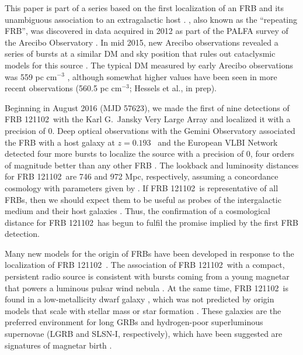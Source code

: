 \documentclass[twocolumn]{aastex61}
\newcommand{\frb}{FRB 121102}
\begin{document}
This paper is part of a series based on the first localization of an FRB and its unambiguous association to an extragalactic host \citep{LOC, OPT, EVN}. , also known as the ``repeating FRB'', was discovered \citep{2014ApJ...790..101S} in data acquired in 2012 as part of the PALFA survey of the Arecibo Observatory \citep{2006ApJ...637..446C, 2015ApJ...812...81L}. In mid 2015, new Arecibo observations revealed a series of bursts at a similar DM and sky position that rules out cataclysmic models for this source \citep{2016Natur.531..202S}. The typical DM measured by early Arecibo observations was 559 pc cm$^{-3}$ \citep{2016arXiv160308880S}, although somewhat higher values have been seen in more recent observations (560.5 pc cm$^{-3}$; Hessels et al., in prep).

Beginning in August 2016 (MJD 57623), we made the first of nine detections of \frb\ with the Karl G.\ Jansky Very Large Array \citep[VLA;][]{LOC} and localized it with a precision of 0. Deep optical observations with the Gemini Observatory associated the FRB with a host galaxy at $z=0.193$\ \citep{OPT} and the European VLBI Network detected four more bursts to localize the source with a precision of 0, four orders of magnitude better than any other FRB \citep[precision of $\sim40$\ pc in linear distance;][]{EVN}. The lookback and luminosity distances for \frb\ are 746 and 972 Mpc, respectively, assuming a concordance cosmology with parameters given by \citet{2016A&A...594A..13P}. If \frb\ is representative of all FRBs, then we should expect them to be useful as probes of the intergalactic medium and their host galaxies \citep{2015MNRAS.451.3278M}. Thus, the confirmation of a cosmological distance for \frb\ has begun to fulfil the promise implied by the first FRB detection.

Many new models for the origin of FRBs have been developed in response to the localization of \frb\ \citep{2017arXiv170104815K, 2017arXiv170102370M, 2017arXiv170104094Z, 2017arXiv170102492D, 2017arXiv170208644B, 2017arXiv170300393T}. The association of \frb\ with a compact, persistent radio source is consistent with bursts coming from a young magnetar that powers a luminous pulsar wind nebula \citep{2017arXiv170104815K}. At the same time, \frb\ is found in a low-metallicity dwarf galaxy \citep{OPT}, which was not predicted by origin models that scale with stellar mass or star formation \citep{2017arXiv170400022N}. These galaxies are the preferred environment for long GRBs and hydrogen-poor superluminous supernovae (LGRB and SLSN-I, respectively), which have been suggested are signatures of magnetar birth \citep{2008AJ....135.1136M, 2014ApJ...787..138L}.
\end{document}
